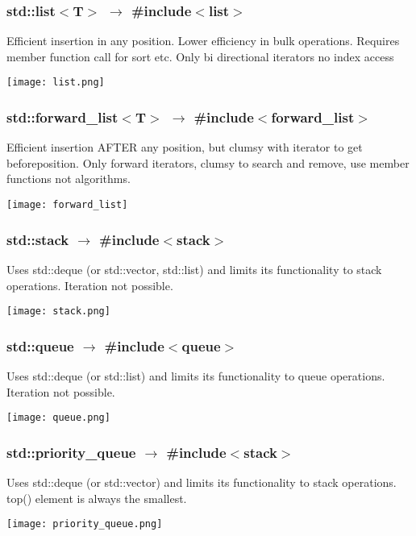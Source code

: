 \subsubsection{std::list$<$T$>$ $\rightarrow$ \#include$<$list$>$}
Efficient insertion in any position. Lower efficiency in bulk operations. Requires member function call for sort etc. Only bi directional iterators no index access
\begin{center}
    \texttt{[image: list.png]}
\end{center}
\subsubsection{std::forward\_list$<$T$>$ $\rightarrow$ \#include$<$forward\_list$>$}
Efficient insertion AFTER any position, but clumsy with iterator to get \dq before\dq position. Only forward iterators, clumsy to search and remove, use member functions not algorithms.
\begin{center}
    \texttt{[image: forward\_list]}
\end{center}
\subsubsection{std::stack $\rightarrow$ \#include$<$stack$>$}
Uses std::deque (or std::vector, std::list) and limits its functionality to stack operations. Iteration not possible.
\begin{center}
    \texttt{[image: stack.png]}
\end{center}
\subsubsection{std::queue $\rightarrow$ \#include$<$queue$>$}
Uses std::deque (or std::list) and limits its functionality to queue operations. Iteration not possible.
\begin{center}
    \texttt{[image: queue.png]}
\end{center}
\subsubsection{std::priority\_queue $\rightarrow$ \#include$<$stack$>$}
Uses std::deque (or std::vector) and limits its functionality to stack operations. top() element is always the smallest.
\begin{center}
    \texttt{[image: priority\_queue.png]}
\end{center}
